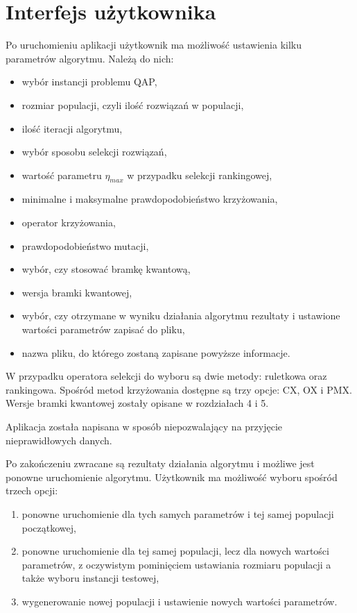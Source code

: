 \section{Interfejs użytkownika}
Po uruchomieniu aplikacji użytkownik ma możliwość ustawienia kilku parametrów algorytmu. Należą do nich:
\begin{itemize}
\item wybór instancji problemu QAP,
\item rozmiar populacji, czyli ilość rozwiązań w populacji,
\item ilość iteracji algorytmu,
\item wybór sposobu selekcji rozwiązań,
\item wartość parametru $\eta_{max}$ w przypadku selekcji rankingowej,
\item minimalne i maksymalne prawdopodobieństwo krzyżowania,
\item operator krzyżowania,
\item prawdopodobieństwo mutacji,
\item wybór, czy stosować bramkę kwantową,
\item wersja bramki kwantowej,
\item wybór, czy otrzymane w wyniku działania algorytmu rezultaty i ustawione wartości parametrów zapisać do pliku,
\item nazwa pliku, do którego zostaną zapisane powyższe informacje.
\end{itemize}

W przypadku operatora selekcji do wyboru są dwie metody: ruletkowa oraz rankingowa. Spośród metod krzyżowania dostępne są trzy opcje: CX, OX i PMX. Wersje bramki kwantowej zostały opisane w rozdziałach 4 i 5.

Aplikacja została napisana w sposób niepozwalający na przyjęcie nieprawidłowych danych.

Po zakończeniu zwracane są rezultaty działania algorytmu i możliwe jest ponowne uruchomienie algorytmu. Użytkownik ma możliwość wyboru spośród trzech opcji:
\begin{enumerate}
\item ponowne uruchomienie dla tych samych parametrów i tej samej populacji początkowej,
\item ponowne uruchomienie dla tej samej populacji, lecz dla nowych wartości parametrów, z oczywistym pominięciem ustawiania rozmiaru populacji a także wyboru instancji testowej,
\item wygenerowanie nowej populacji i ustawienie nowych wartości parametrów.
\end{enumerate}

